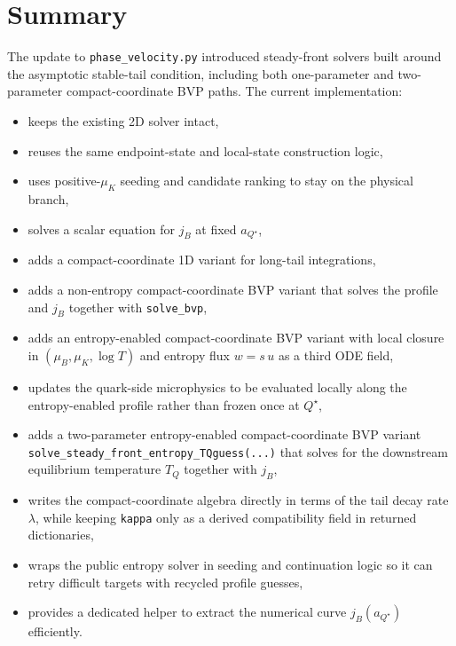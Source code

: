 \documentclass[11pt]{article}
\begin{document}
\section{Summary}
The update to \texttt{phase\_velocity.py} introduced steady-front solvers built
around the asymptotic stable-tail condition, including both one-parameter and
two-parameter compact-coordinate BVP paths.
The current implementation:
\begin{itemize}[leftmargin=1.5em]
\item keeps the existing 2D solver intact,
\item reuses the same endpoint-state and local-state construction logic,
\item uses positive-$\mu_K$ seeding and candidate ranking to stay on the
      physical branch,
\item solves a scalar equation for $j_B$ at fixed $a_{Q^\star}$,
\item adds a compact-coordinate 1D variant for long-tail integrations,
\item adds a non-entropy compact-coordinate BVP variant that solves the
      profile and $j_B$ together with \texttt{solve\_bvp},
\item adds an entropy-enabled compact-coordinate BVP variant with local
      closure in $(\mu_B,\mu_K,\log T)$ and entropy flux
      $w=s\,u$ as a third ODE field,
\item updates the quark-side microphysics to be evaluated locally along the
      entropy-enabled profile rather than frozen once at $Q^\star$,
\item adds a two-parameter entropy-enabled compact-coordinate BVP variant
      \texttt{solve\_steady\_front\_entropy\_TQguess(...)} that solves for the
      downstream equilibrium temperature $T_Q$ together with $j_B$,
\item writes the compact-coordinate algebra directly in terms of the tail
      decay rate $\lambda$, while keeping \texttt{kappa} only as a derived
      compatibility field in returned dictionaries,
\item wraps the public entropy solver in seeding and continuation logic so it
      can retry difficult targets with recycled profile guesses,
\item provides a dedicated helper to extract the numerical curve
      $j_B(a_{Q^\star})$ efficiently.
\end{itemize}
\end{document}
